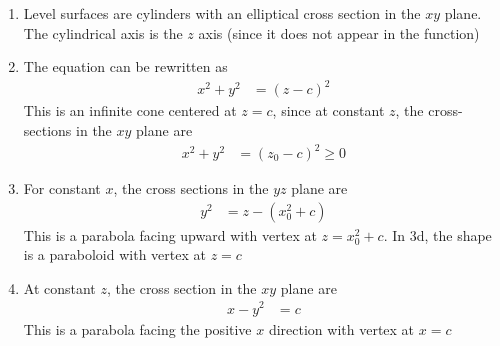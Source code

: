 \begin{enumerate}
    \item Level surfaces are cylinders with an elliptical cross section in the $ xy $
          plane. The cylindrical axis is the $ z $ axis (since it does not appear in the
          function)

    \item The equation can be rewritten as
          \begin{align}
              x^2 + y^2 & = (z - c)^2
          \end{align}
          This is an infinite cone centered at $ z = c $, since at constant $ z $, the
          cross-sections in the $ xy $ plane are
          \begin{align}
              x^2 + y^2 & = (z_0 - c)^2  \geq 0
          \end{align}

    \item For constant $ x $, the cross sections in the $ yz $ plane are
          \begin{align}
              y^2 & = z - (x_0^2 + c)
          \end{align}
          This is a parabola facing upward with vertex at $ z = x_0^2 + c $. In 3d,
          the shape is a paraboloid with vertex at $ z = c $

    \item At constant $ z $, the cross section in the $ xy $ plane are
          \begin{align}
              x - y^2 & = c
          \end{align}
          This is a parabola facing the positive $x$ direction with vertex at $ x = c $


\end{enumerate}
